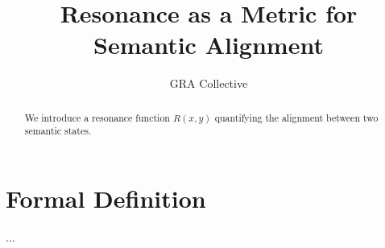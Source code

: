 \documentclass{article}
\title{Resonance as a Metric for Semantic Alignment}
\author{GRA Collective}
\begin{document}
\maketitle
\begin{abstract}
We introduce a resonance function \(R(x,y)\) quantifying the alignment between two semantic states.
\end{abstract}
\section{Formal Definition}
...
\end{document}
